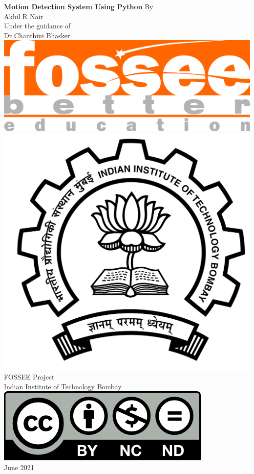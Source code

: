 \begin{center}
    {\bf {\Huge Motion Detection System Using Python}}
    \vfill
    By \\
    Akhil R Nair \\
   \vfill
    Under the guidance of \\
    Dr Chanthini Bhasker\\
    \vfill
    \includegraphics[width=0.3\linewidth]{suppl/fossee_logo_hi.png} \quad
    \includegraphics[width=0.2\linewidth]{suppl/IITB-logo-HighRes.png} \\
    FOSSEE Project \\
    Indian Institute of Technology Bombay \\ [2mm]
    \includegraphics[width=0.15\linewidth]{suppl/by-nc-nd.png} \\ [1mm]
    June 2021
\end{center}

\clearpage
